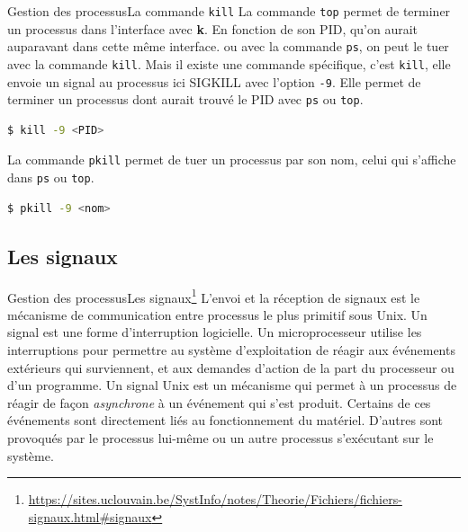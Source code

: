 \documentclass{beamer}
\begin{document}
    \begin{frame}[fragile]{Gestion des processus}{La commande \lstinline{kill}}
        La commande \lstinline{top} permet de terminer un processus dans l'interface avec \textbf{k}.
        En fonction de son PID, qu'on aurait auparavant dans cette même interface.
        ou avec la commande \lstinline{ps}, on peut le tuer avec la commande \lstinline{kill}.
        \bigbreak
        Mais il existe une commande spécifique, c'est \lstinline{kill}, elle envoie un signal au processus ici SIGKILL avec l'option \lstinline{-9}.
        Elle permet de terminer un processus dont aurait trouvé le PID avec \lstinline{ps} ou \lstinline{top}.
        \begin{lstlisting}[language=bash]
$ kill -9 <PID>
        \end{lstlisting}
        \bigbreak
        La commande \lstinline{pkill} permet de tuer un processus par son nom, celui qui s'affiche dans \lstinline{ps} ou \lstinline{top}.
        \begin{lstlisting}[language=bash]
$ pkill -9 <nom>
        \end{lstlisting}
    \end{frame}

    \subsection{Les signaux}\label{subsec:signals}

    \begin{frame}{Gestion des processus}{Les signaux\footnote{\label{uclouvain-signaux}\url{https://sites.uclouvain.be/SystInfo/notes/Theorie/Fichiers/fichiers-signaux.html\#signaux}}}
        L'envoi et la réception de signaux est le mécanisme de communication entre processus le plus primitif sous Unix.
        Un signal est une forme d'interruption logicielle.
        Un microprocesseur utilise les interruptions pour permettre au système d'exploitation de réagir aux événements extérieurs qui surviennent, et aux demandes d'action de la part du processeur ou d'un programme.
        Un signal Unix est un mécanisme qui permet à un processus de réagir de façon \textit{asynchrone} à un événement qui s'est produit.
        Certains de ces événements sont directement liés au fonctionnement du matériel.
        D'autres sont provoqués par le processus lui-même ou un autre processus s'exécutant sur le système.
    \end{frame}
\end{document}
